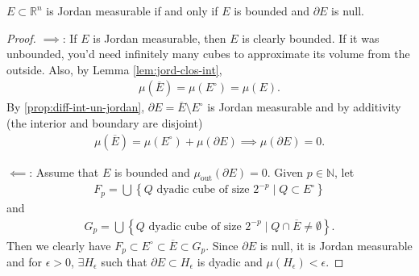 \begin{theorem}\label{thm:jordan-theorem}
    $E \subset \mathbb{R}^{n}$ is Jordan measurable if and only if $E$ is bounded and $\partial E$ is null.
\end{theorem}
\begin{proof}
    $\implies$: If $E$ is Jordan measurable, then $E$ is clearly bounded. If it was unbounded, you'd need infinitely many cubes to approximate its volume from the outside. Also, by Lemma \ref{lem:jord-clos-int}, 
    \begin{align*}
        \mu(\overline{ E } ) = \mu(E^{\circ }) = \mu(E).
    \end{align*}
    By \ref{prop:diff-int-un-jordan}, $\partial E = \overline{ E } \setminus E^{\circ }$ is Jordan measurable and by additivity (the interior and boundary are disjoint)
    \begin{align*}
        \mu(\overline{ E } ) = \mu(E^{\circ }) + \mu( \partial E) \implies \mu( \partial E ) = 0.
    \end{align*}

    $\impliedby$: Assume that $E$ is bounded and $\mu_{\text{out}}(\partial E ) = 0$. Given $p \in \mathbb{N}$, let 
    \begin{align*}
        F_{p} = \bigcup \left\{ Q \text{ dyadic cube of size } 2^{-p} \mid Q \subset E^{\circ } \right\}
    \end{align*}
    and
    \begin{align*}
        G_{p} = \bigcup \left\{ Q \text{ dyadic cube of size } 2^{-p} \mid Q \cap \overline{ E } \neq \emptyset \right\}.
    \end{align*}
    Then we clearly have $F_{p} \subset E^{\circ } \subset \overline{ E } \subset G_{p}$. Since $\partial E$ is null, it is Jordan measurable and for $\epsilon > 0$, $\exists H_{\epsilon}$ such that $\partial E \subset H_{\epsilon}$ is dyadic and $\mu(H_{\epsilon}) < \epsilon$.


\end{proof}
